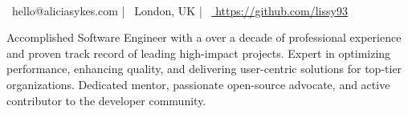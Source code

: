 \documentclass[]{resume-format}
\begin{document}
\begin{center}
      \\
    \vspace{2mm}
    {\faEnvelope\ hello@aliciasykes.com} | {\faMapMarker\ London, UK} | {\faLink\ \href{ https://github.com/lissy93 }{ https://github.com/lissy93 }}
\end{center}


\begin{cvpersonalstatement}
  \item { Accomplished Software Engineer with a over a decade of professional experience and proven track record of leading high-impact projects. Expert in optimizing performance, enhancing quality, and delivering user-centric solutions for top-tier organizations. Dedicated mentor, passionate open-source advocate, and active contributor to the developer community. }
\end{cvpersonalstatement}


\end{document}
